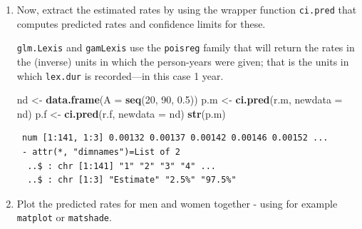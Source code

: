 \documentclass[
]{book}
\newenvironment{Shaded}{\begin{snugshade}}{\end{snugshade}}
\newcommand{\AttributeTok}[1]{\textcolor[rgb]{0.13,0.29,0.53}{#1}}
\newcommand{\DecValTok}[1]{\textcolor[rgb]{0.00,0.00,0.81}{#1}}
\newcommand{\FloatTok}[1]{\textcolor[rgb]{0.00,0.00,0.81}{#1}}
\newcommand{\FunctionTok}[1]{\textcolor[rgb]{0.13,0.29,0.53}{\textbf{#1}}}
\newcommand{\NormalTok}[1]{#1}
\newcommand{\OtherTok}[1]{\textcolor[rgb]{0.56,0.35,0.01}{#1}}
\newcommand{\SpecialCharTok}[1]{\textcolor[rgb]{0.81,0.36,0.00}{\textbf{#1}}}
\newcommand{\StringTok}[1]{\textcolor[rgb]{0.31,0.60,0.02}{#1}}
\theoremstyle{definition}
\theoremstyle{definition}
\theoremstyle{definition}
\theoremstyle{definition}
\theoremstyle{remark}
\begin{document}
\begin{enumerate}
\begin{verbatim}
mgcv::gam Poisson analysis of Lexis object subset(SL, sex == "M") with log link:
Rates for the transition:
Alive->Dead
\end{verbatim}

\begin{Shaded}
\begin{Highlighting}[]
\NormalTok{r.f }\OtherTok{\textless{}{-}} \FunctionTok{gamLexis}\NormalTok{(}\FunctionTok{subset}\NormalTok{(SL, sex }\SpecialCharTok{==} \StringTok{"F"}\NormalTok{), }\SpecialCharTok{\textasciitilde{}} \FunctionTok{s}\NormalTok{(A, }\AttributeTok{k =} \DecValTok{10}\NormalTok{))}
\end{Highlighting}
\end{Shaded}

\begin{verbatim}
mgcv::gam Poisson analysis of Lexis object subset(SL, sex == "F") with log link:
Rates for the transition:
Alive->Dead
\end{verbatim}
\item
  Now, extract the estimated rates by using the wrapper function
  \texttt{ci.pred} that computes predicted rates and confidence
  limits for these.

  \texttt{glm.Lexis} and \texttt{gamLexis} use the \texttt{poisreg} family that will return
  the rates in the (inverse) units in which the person-years were
  given; that is the units in which \texttt{lex.dur} is recorded---in
  this case 1 year.

\begin{Shaded}
\begin{Highlighting}[]
\NormalTok{nd }\OtherTok{\textless{}{-}} \FunctionTok{data.frame}\NormalTok{(}\AttributeTok{A =} \FunctionTok{seq}\NormalTok{(}\DecValTok{20}\NormalTok{, }\DecValTok{90}\NormalTok{, }\FloatTok{0.5}\NormalTok{))}
\NormalTok{p.m }\OtherTok{\textless{}{-}} \FunctionTok{ci.pred}\NormalTok{(r.m, }\AttributeTok{newdata =}\NormalTok{ nd)}
\NormalTok{p.f }\OtherTok{\textless{}{-}} \FunctionTok{ci.pred}\NormalTok{(r.f, }\AttributeTok{newdata =}\NormalTok{ nd)}
\FunctionTok{str}\NormalTok{(p.m)}
\end{Highlighting}
\end{Shaded}

\begin{verbatim}
 num [1:141, 1:3] 0.00132 0.00137 0.00142 0.00146 0.00152 ...
 - attr(*, "dimnames")=List of 2
  ..$ : chr [1:141] "1" "2" "3" "4" ...
  ..$ : chr [1:3] "Estimate" "2.5%" "97.5%"
\end{verbatim}
\item
  Plot the predicted rates for men and women together - using for
  example \texttt{matplot} or \texttt{matshade}.


\end{enumerate}
\end{document}

